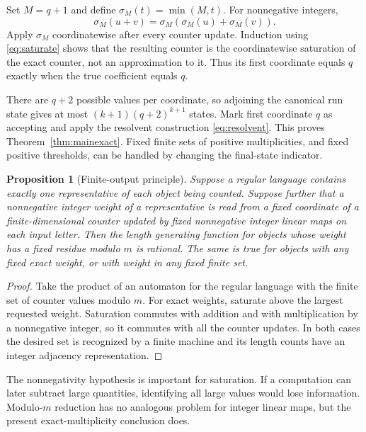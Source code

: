 \documentclass[11pt,letterpaper]{article}
\numberwithin{equation}{section}
\newtheorem{proposition}[theorem]{Proposition}
\theoremstyle{definition}
\theoremstyle{remark}
\begin{document}
Set $M=q+1$ and define $\sigma_M(t)=\min(M,t)$. For nonnegative integers,
\begin{equation}
 \sigma_M(u+v)=\sigma_M(\sigma_M(u)+\sigma_M(v)).
 \label{eq:saturate}
\end{equation}
Apply $\sigma_M$ coordinatewise after every counter update. Induction using
\eqref{eq:saturate} shows that the resulting counter is the coordinatewise
saturation of the exact counter, not an approximation to it. Thus its
first coordinate equals $q$ exactly when the true coefficient equals $q$.

There are $q+2$ possible values per coordinate, so adjoining the canonical
run state gives at most $(k+1)(q+2)^{k+1}$ states. Mark first coordinate
$q$ as accepting and apply the resolvent construction
\eqref{eq:resolvent}. This proves Theorem~\ref{thm:mainexact}. Fixed finite
sets of positive multiplicities, and fixed positive thresholds, can be
handled by changing the final-state indicator.

\begin{proposition}[Finite-output principle]
\label{prop:principle}
Suppose a regular language contains exactly one representative of each
object being counted. Suppose further that a nonnegative integer weight
of a representative is read from a fixed coordinate of a finite-dimensional
counter updated by fixed nonnegative integer linear maps on each input letter. Then the
length generating function for objects whose weight has a fixed residue
modulo $m$ is rational. The same is true for objects with any fixed exact
weight, or with weight in any fixed finite set.
\end{proposition}
\begin{proof}
Take the product of an automaton for the regular language with the finite
set of counter values modulo $m$. For exact weights, saturate above the
largest requested weight. Saturation commutes with addition and with
multiplication by a nonnegative integer, so it commutes with all the
counter updates. In both cases the desired set is recognized by a finite
machine and its length counts have an integer adjacency representation.
\end{proof}

The nonnegativity hypothesis is important for saturation. If a computation
can later subtract large quantities, identifying all large values would
lose information. Modulo-$m$ reduction has no analogous problem for
integer linear maps, but the present exact-multiplicity conclusion does.
\end{document}
